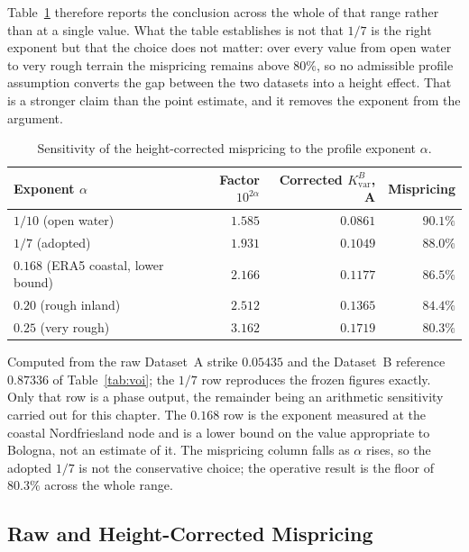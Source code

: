 \documentclass[11pt, a4paper, twoside]{article}
\begin{document}
Table~\ref{tab:height-sensitivity} therefore reports the conclusion across the whole of that range rather than at a single value. What the table establishes is not that $1/7$ is the right exponent but that the choice does not matter: over every value from open water to very rough terrain the mispricing remains above $80\%$, so no admissible profile assumption converts the gap between the two datasets into a height effect. That is a stronger claim than the point estimate, and it removes the exponent from the argument.

\begin{table}[htbp]
\centering
\small
\caption{Sensitivity of the height-corrected mispricing to the profile exponent $\alpha$.}
\label{tab:height-sensitivity}
\begin{tabular}{l r r r}
\toprule
\textbf{Exponent $\alpha$} & \textbf{Factor $10^{2\alpha}$} & \textbf{Corrected $K_{\text{var}}^B$, A} & \textbf{Mispricing} \\
\midrule
$1/10$ (open water) & $1.585$ & $0.0861$ & $90.1\%$ \\
$1/7$ (adopted) & $1.931$ & $0.1049$ & $88.0\%$ \\
$0.168$ (ERA5 coastal, lower bound) & $2.166$ & $0.1177$ & $86.5\%$ \\
$0.20$ (rough inland) & $2.512$ & $0.1365$ & $84.4\%$ \\
$0.25$ (very rough) & $3.162$ & $0.1719$ & $80.3\%$ \\
\bottomrule
\end{tabular}
\par\vspace{4pt}
\begin{minipage}{0.92\textwidth}
\footnotesize Computed from the raw Dataset~A strike $0.05435$ and the Dataset~B reference $0.87336$ of Table~\ref{tab:voi}; the $1/7$ row reproduces the frozen figures exactly. Only that row is a phase output, the remainder being an arithmetic sensitivity carried out for this chapter. The $0.168$ row is the exponent measured at the coastal Nordfriesland node and is a lower bound on the value appropriate to Bologna, not an estimate of it. The mispricing column falls as $\alpha$ rises, so the adopted $1/7$ is not the conservative choice; the operative result is the floor of $80.3\%$ across the whole range.
\end{minipage}
\end{table}

\subsection{Raw and Height-Corrected Mispricing}
\label{sec:voi-headline}
\end{document}
